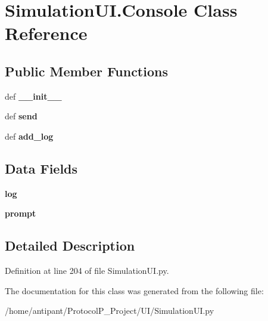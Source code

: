 \hypertarget{classSimulationUI_1_1Console}{\section{Simulation\-U\-I.\-Console Class Reference}
\label{classSimulationUI_1_1Console}
}
\subsection*{Public Member Functions}
\begin{DoxyCompactItemize}
\item 
\hypertarget{classSimulationUI_1_1Console_a5de1c29e64e0559fc6f5b69ff22cb892}{def {\bfseries \-\_\-\-\_\-init\-\_\-\-\_\-}}\label{classSimulationUI_1_1Console_a5de1c29e64e0559fc6f5b69ff22cb892}

\item 
\hypertarget{classSimulationUI_1_1Console_a09250d473ecb6e32cf34c980f0c3de03}{def {\bfseries send}}\label{classSimulationUI_1_1Console_a09250d473ecb6e32cf34c980f0c3de03}

\item 
\hypertarget{classSimulationUI_1_1Console_a6f9d846cbd66a681b3f18294bee80c01}{def {\bfseries add\-\_\-log}}\label{classSimulationUI_1_1Console_a6f9d846cbd66a681b3f18294bee80c01}

\end{DoxyCompactItemize}
\subsection*{Data Fields}
\begin{DoxyCompactItemize}
\item 
\hypertarget{classSimulationUI_1_1Console_a9f59684b680f0d9877deaa446603b317}{{\bfseries log}}\label{classSimulationUI_1_1Console_a9f59684b680f0d9877deaa446603b317}

\item 
\hypertarget{classSimulationUI_1_1Console_a0b802bbad21c9f03c1dba08f4dc0e7ce}{{\bfseries prompt}}\label{classSimulationUI_1_1Console_a0b802bbad21c9f03c1dba08f4dc0e7ce}

\end{DoxyCompactItemize}


\subsection{Detailed Description}


Definition at line 204 of file Simulation\-U\-I.\-py.



The documentation for this class was generated from the following file\-:\begin{DoxyCompactItemize}
\item 
/home/antipant/\-Protocol\-P\-\_\-\-Project/\-U\-I/Simulation\-U\-I.\-py\end{DoxyCompactItemize}
